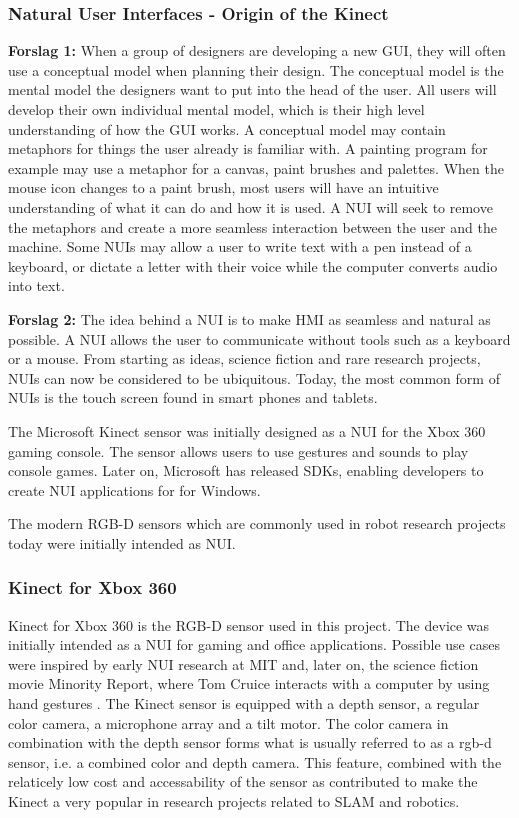 \subsubsection{Natural User Interfaces - Origin of the Kinect}

\textbf{Forslag 1:}
When a group of designers are developing a new \ac{GUI}, they will often use a conceptual model when planning their design. The conceptual model is the mental model the designers want to put into the head of the user. All users will develop their own individual mental model, which is their high level understanding of how the \ac{GUI} works. A conceptual model may contain metaphors for things  the user already is familiar with. A painting program for example may use a metaphor for a canvas, paint brushes and palettes. When the mouse icon changes to a paint brush, most users will have an intuitive understanding of what it can do and how it is used. A \ac{NUI} will seek to remove the metaphors and create a more seamless interaction between the user and the machine. Some \ac{NUI}s may allow a user to write text with a pen instead of a keyboard, or dictate a letter with their voice while the computer converts audio into text. 

\textbf{Forslag 2:}
The idea behind a \ac{NUI} is to make \ac{HMI} as seamless and natural as possible. A \ac{NUI} allows the user to communicate without tools such as a keyboard or a mouse. From starting as ideas, science fiction and rare research projects, \ac{NUI}s can now be considered to be ubiquitous. Today, the most common form of \ac{NUI}s is the touch screen found in smart phones and tablets. 

The Microsoft Kinect sensor was initially designed as a \ac{NUI} for the Xbox 360 gaming console. The sensor allows users to use gestures and sounds to play console games. Later on, Microsoft has released SDKs, enabling developers to create \ac{NUI} applications for for Windows. 

The modern RGB-D sensors which are commonly used in robot research projects today were initially intended as \ac{NUI}.

\subsubsection{Kinect for Xbox 360}

Kinect for Xbox 360 is the RGB-D sensor used in this project. The device was initially intended as a \ac{NUI} for gaming and office applications. Possible use cases were inspired by early \ac{NUI} research at \ac{MIT} and, later on, the science fiction movie Minority Report, where Tom Cruice interacts with a computer by using hand gestures \cite{kinect_book}. The Kinect sensor is equipped with a depth sensor, a regular color camera, a microphone array and a tilt motor. The color camera in combination with the depth sensor forms what is usually referred to as a rgb-d sensor, i.e. a combined color and depth camera. This feature, combined with the relaticely low cost and accessability of the sensor as contributed to make the Kinect a very popular in research projects related to \ac{SLAM} and robotics.

